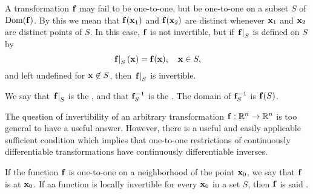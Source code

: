  
A transformation $\mathbf{ f}$ may fail to be one-to-one, but be
one-to-one on a subset $S$ of $\operatorname{Dom}(\mathbf{ f})$. By this we mean that
$\mathbf{ f}(\mathbf{ x}_1)$ and $\mathbf{ f}(\mathbf{ x}_2)$ are
distinct whenever $\mathbf{ x}_{1}$
 and $\mathbf{ x}_2$ are distinct points of $S$. In this case,
$\mathbf{ f}$ is not invertible, but if $\left.\mathbf{ f}\right|_{S}$ is defined on
$S$ by
$$
\left.\mathbf{ f}\right|_{S}(\mathbf{ x})=\mathbf{ f}(\mathbf{ x}),\quad \mathbf{ x}\in S,
$$
and left undefined for $\mathbf{ x}\not\in S$, then $\left.\mathbf{ f}\right|_{S}$ is
invertible.

We say that $\left.\mathbf{ f}\right|_{S}$ is the ,
and that $\mathbf{ f}^{-1}_S$ is the . The domain of $\mathbf{ f}^{-1}_S$ is
$\mathbf{ f}(S)$.

The question of invertibility of an arbitrary transformation $\mathbf{ f}:
\mathbb{R}^n\to \mathbb{R}^n$ is too general to have a useful answer.
However, there is a useful and easily applicable sufficient condition
which implies that one-to-one restrictions of continuously
differentiable transformations have continuously differentiable
inverses.



\begin{df}
If the function $\mathbf{ f}$ is one-to-one on a neighborhood of the point $\mathbf{ x}_0$, we say
that $\mathbf{ f}$ is  at $\mathbf{ x}_0$.
 If aa function is locally invertible for every $\mathbf{ x}_0$ in a set $S$, then $\mathbf{ f}$ is said . 
\end{df}



